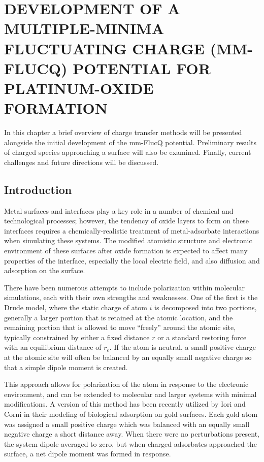 
\chapter{DEVELOPMENT OF A MULTIPLE-MINIMA FLUCTUATING CHARGE (MM-FLUCQ) POTENTIAL FOR PLATINUM-OXIDE FORMATION}
\label{chap:mmFlucQ}


In this chapter a brief overview of charge transfer methods will be presented
alongside the initial development of the mm-FlucQ potential.  Preliminary
results of charged species approaching a  surface will also be
examined. Finally, current challenges and future directions will be discussed.


\section{Introduction}
Metal surfaces and interfaces play a key role in a number of chemical and
technological processes; however, the tendency of oxide layers to form on these
interfaces requires a chemically-realistic treatment of metal-adsorbate interactions when
simulating these systems\citep{Streitz:1994mw, Duin:2010dk, Devine:2011bk,
Fantauzzi:2014pb}.  The modified atomistic structure and electronic environment
of these surfaces after oxide formation is expected to affect many properties
of the interface, especially the local electric field, and also diffusion and
adsorption on the surface.\citep{Streitz:1994mw, Getman:2008sp,
Bray:2011hq,Small:2012dw}

There have been numerous attempts to include polarization within molecular
simulations, each with their own strengths and weaknesses.\citep{} One of the
first is the Drude model\citep{}, where the static charge of atom $i$ is
decomposed into two portions, generally a larger portion that is retained at
the atomic location, and the remaining portion that is allowed to move
``freely'' around the atomic site, typically constrained by either a fixed
distance $r$ or a standard restoring force with an equilibrium distance of
$r_e$. If the atom is neutral, a small positive charge at the atomic site will
often be balanced by an equally small negative charge so that a simple dipole
moment is created. 

This approach allows for polarization of the atom in response to the electronic
environment, and can be extended to molecular and larger systems with minimal
modifications.  A version of this method has been recently utilized by Iori and
Corni in their modeling of biological adsorption on gold surfaces.\citep{} Each
gold atom was assigned a small positive charge which was balanced with an
equally small negative charge a short distance away. When there were no
perturbations present, the system dipole averaged to zero, but when charged
adsorbates approached the surface, a net dipole moment was formed in response.

